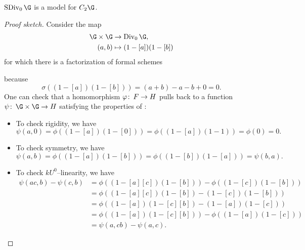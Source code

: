 \begin{theorem}\label{SDivModelsC2}
$\SDiv_0 \G$ is a model for $C_2 \G$.
\end{theorem}
\begin{proof}[Proof sketch]
Consider the map
\begin{align*}
\G \times \G & \to \Div_0 \G, \\
(a, b) & \mapsto (1 - [a])(1 - [b])
\end{align*}
for which there is a factorization of formal schemes
\begin{center}
\end{center}
because \[\sigma((1 - [a])(1 - [b])) = (a + b) - a - b + 0 = 0.\]  One can check that a homomorphism $\varphi\colon\thinspace F \to H$ pulls back to a function $\psi\co \G \times \G \to H$ satisfying the properties of :
\begin{itemize}
    \item To check rigidity, we have \[\psi(a, 0) = \phi((1 - [a])(1 - [0])) = \phi((1 - [a])(1 - 1)) = \phi(0) = 0.\]
    \item To check symmetry, we have \[\psi(a, b) = \phi((1 - [a])(1 - [b])) = \phi((1 - [b])(1 - [a])) = \psi(b, a).\]
    \item To check $kU^0$--linearity, we have
    \begin{align*}
    \psi(ac, b) - \psi(c, b) & = \phi((1 - [a][c])(1 - [b])) - \phi((1 - [c])(1 - [b])) \\
    & = \phi((1 - [a][c])(1 - [b]) - (1 - [c])(1 - [b])) \\
    & = \phi((1 - [a])(1 - [c][b]) - (1 - [a])(1 - [c])) \\
    & = \phi((1 - [a])(1 - [c][b])) - \phi((1 - [a])(1 - [c])) \\
    & = \psi(a, cb) - \psi(a, c).
    \end{align*}
\end{itemize}


\end{proof}
